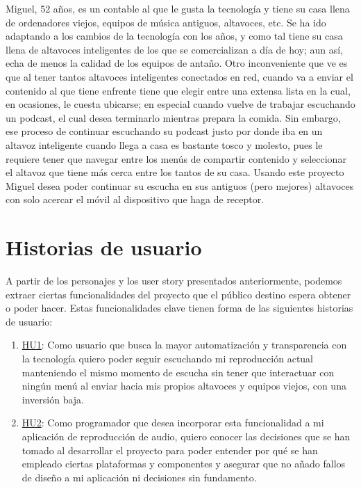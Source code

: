 Miguel, 52 años, es un contable al que le gusta la tecnología y tiene
su casa llena de ordenadores viejos, equipos de música antiguos, altavoces,
etc. Se ha ido adaptando a los cambios de la tecnología con los años, y como
tal tiene su casa llena de altavoces inteligentes de los que se
comercializan a día de hoy; aun así, echa de menos la calidad de los equipos
de antaño. Otro inconveniente que ve es que al tener tantos altavoces
inteligentes conectados en red, cuando va a enviar el contenido al que tiene
enfrente tiene que elegir entre una extensa lista en la cual, en ocasiones,
le cuesta ubicarse; en especial cuando vuelve de trabajar escuchando un
podcast, el cual desea terminarlo mientras prepara la comida. Sin embargo,
ese proceso de continuar escuchando su podcast justo por donde iba en un
altavoz inteligente cuando llega a casa es bastante tosco y molesto, pues le
requiere tener que navegar entre los menús de compartir contenido y
seleccionar el altavoz que tiene más cerca entre los tantos de su casa.
Usando este proyecto Miguel desea poder continuar su escucha en sus antiguos
(pero mejores) altavoces con solo acercar el móvil al dispositivo que haga
de receptor.



\section{Historias de usuario}
A partir de los personajes y los user story presentados anteriormente, podemos
extraer ciertas funcionalidades del proyecto que el público destino espera
obtener o poder hacer. Estas funcionalidades clave tienen forma de las
siguientes historias de usuario:

\begin{enumerate}
    \item
    \href{https://github.com/migueorg/One-touch-music-streaming-TFG-ETSIIT/issues/10}{HU1}:
    Como usuario que busca la mayor automatización y transparencia con la
    tecnología quiero poder seguir escuchando mi reproducción actual manteniendo
    el mismo momento de escucha sin tener que interactuar con ningún menú al
    enviar hacia mis propios altavoces y equipos viejos, con una inversión baja.
    \item
    \href{https://github.com/migueorg/One-touch-music-streaming-TFG-ETSIIT/issues/14}{HU2}:
    Como programador que desea incorporar esta funcionalidad a mi aplicación de
    reproducción de audio, quiero conocer las decisiones que se han tomado al
    desarrollar el proyecto para poder entender por qué se han empleado ciertas
    plataformas y componentes y asegurar que no añado fallos de diseño a mi
    aplicación ni decisiones sin fundamento.
\end{enumerate}



